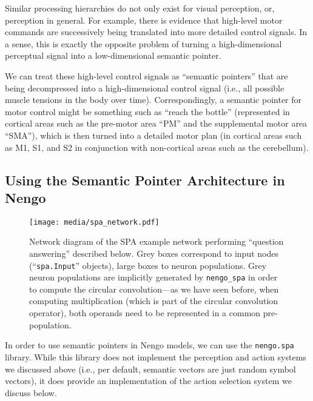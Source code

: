 \documentclass[10pt,letterpaper,oneside]{article}
\begin{document}
Similar processing hierarchies do not only exist for visual perception, or, perception in general. For example, there is evidence that high-level motor commands are successively being translated into more detailed control signals. In a sense, this is exactly the opposite problem of turning a high-dimensional perceptual signal into a low-dimensional semantic pointer. 

We can treat these high-level control signals as \enquote{semantic pointers} that are being decompressed into a high-dimensional control signal (i.e., all possible muscle tensions in the body over time). Correspondingly, a semantic pointer for motor control might be something such as \enquote{reach the bottle} (represented in cortical areas such as the pre-motor area \enquote{PM} and the supplemental motor area \enquote{SMA}), which is then turned into a detailed motor plan (in cortical areas such as M1, S1, and S2 in conjunction with non-cortical areas such as the cerebellum).


\subsection{Using the Semantic Pointer Architecture in Nengo}

\begin{figure}
	\centering
	\texttt{[image: media/spa\_network.pdf]}
	\caption{Network diagram of the SPA example network performing \enquote{question answering} described below. Grey boxes correspond to input nodes (\enquote{\texttt{spa.Input}} objects), large boxes to neuron populations. Grey neuron populations are implicitly generated by \texttt{nengo\_spa} in order to compute the circular convolution---as we have seen before, when computing multiplication (which is part of the circular convolution operator), both operands need to be represented in a common pre-population.}
	\label{fig:spa_network}
\end{figure}

In order to use semantic pointers in Nengo models, we can use the \texttt{nengo.spa} library. While this library does not implement the perception and action systems we discussed above (i.e., per default, semantic vectors are just random symbol vectors), it does provide an implementation of the action selection system we discuss below.
\end{document}
